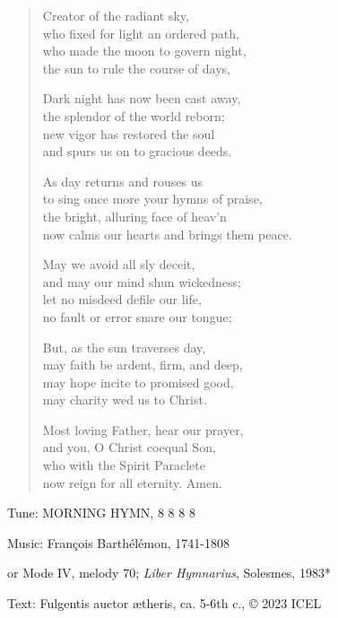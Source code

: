 \hymn

\begin{verse}
Creator of the radiant sky,\\
who fixed for light an ordered path,\\
who made the moon to govern night,\\
the sun to rule the course of days,

Dark night has now been cast away,\\
the splendor of the world reborn;\\
new vigor has restored the soul\\
and spurs us on to gracious deeds.

As day returns and rouses us\\
to sing once more your hymns of praise,\\
the bright, alluring face of heav’n\\
now calms our hearts and brings them peace.

May we avoid all sly deceit,\\
and may our mind shun wickedness;\\
let no misdeed defile our life,\\
no fault or error snare our tongue;

But, as the sun traverses day,\\
may faith be ardent, firm, and deep,\\
may hope incite to promised good,\\
may charity wed us to Christ.

Most loving Father, hear our prayer,\\
and you, O Christ coequal Son,\\
who with the Spirit Paraclete\\
now reign for all eternity. Amen.
\end{verse}

\begin{hymnsource}
Tune: MORNING HYMN, 8 8 8 8

Music: François Barthélémon, 1741-1808

or Mode IV, melody 70; \emph{Liber Hymnarius}, Solesmes, 1983*

Text: Fulgentis auctor ætheris, ca. 5-6th c., © 2023 ICEL
\end{hymnsource}